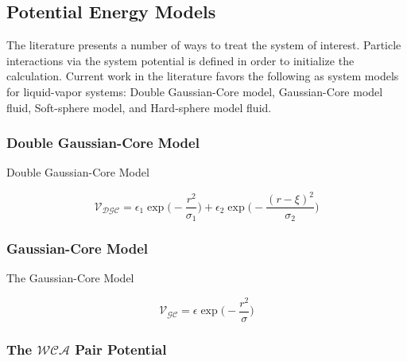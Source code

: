 \documentclass[letterpaper,twocolumn,amsmath,amssymb,pre,aps,10pt]{revtex4-1}
\begin{document}
\subsection{Potential Energy Models}

The literature presents a number of ways to treat the system of interest.  Particle interactions via the system potential is defined in order to initialize the calculation.  Current work in the literature favors the following as system models for liquid-vapor systems: Double Gaussian-Core model, Gaussian-Core model fluid, Soft-sphere model, and Hard-sphere model fluid.

\subsubsection{Double Gaussian-Core Model}

Double Gaussian-Core Model

\begin{equation}
\mathcal{V}_{\mathcal{DGC}}=\epsilon_1\exp\bigg(-\frac{r^2}{\sigma_1}\bigg)+\epsilon_2\exp\bigg(-\frac{(r-\xi)^2}{\sigma_2}\bigg)
\end{equation}

\subsubsection{Gaussian-Core Model}

The Gaussian-Core Model

\begin{equation}
	\mathcal{V}_{\mathcal{GC}}=\epsilon\exp\bigg(-\frac{r^2}{\sigma}\bigg)
\end{equation}
  
\subsubsection{The $\mathcal{WCA}$ Pair Potential}
\end{document}
